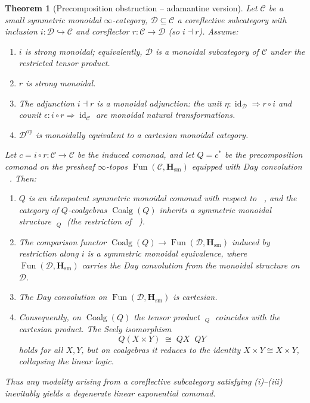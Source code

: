 \documentclass[12pt,a4paper]{article}
\theoremstyle{plain}
\newtheorem{theorem}{Theorem}[section]
\theoremstyle{definition}
\DeclareMathOperator{\Coalg}{Coalg}
\DeclareMathOperator{\id}{id}
\DeclareMathOperator{\Fun}{Fun}
\DeclareMathOperator{\Day}{\otimes_{\mathrm{Day}}}
\begin{document}
\begin{theorem}[Precomposition obstruction -- adamantine version]\label{thm:obstruction}
Let $\mathcal{C}$ be a small symmetric monoidal $\infty$-category,
$\mathcal{D}\subseteq\mathcal{C}$ a coreflective subcategory with inclusion
$i:\mathcal{D}\hookrightarrow\mathcal{C}$ and coreflector $r:\mathcal{C}\to\mathcal{D}$
(so $i\dashv r$).  Assume:
\begin{enumerate}[nosep,label=(\roman*)]
\item $i$ is strong monoidal; equivalently, $\mathcal{D}$ is a monoidal subcategory of $\mathcal{C}$ under the restricted tensor product.
\item $r$ is strong monoidal.
\item The adjunction $i \dashv r$ is a monoidal adjunction: the unit $\eta : \id_{\mathcal{D}} \Rightarrow r \circ i$ and counit $\epsilon : i \circ r \Rightarrow \id_{\mathcal{C}}$ are monoidal natural transformations.
\item $\mathcal{D}^{\mathrm{op}}$ is monoidally equivalent to a cartesian monoidal category.
\end{enumerate}
Let $c = i\circ r : \mathcal{C}\to\mathcal{C}$ be the induced comonad, and let
$Q = c^{*}$ be the precomposition comonad on the presheaf $\infty$-topos
$\Fun(\mathcal{C},\mathbf{H}_{\mathrm{sm}})$ equipped with Day convolution $\Day$.
Then:
\begin{enumerate}[nosep,label=(\arabic*)]
\item $Q$ is an idempotent symmetric monoidal comonad with respect to $\Day$, and the category of $Q$-coalgebras $\Coalg(Q)$ inherits a symmetric monoidal structure $\Day_Q$ (the restriction of $\Day$).
\item The comparison functor $\Coalg(Q)\to\Fun(\mathcal{D},\mathbf{H}_{\mathrm{sm}})$ induced by restriction along $i$ is a symmetric monoidal equivalence, where $\Fun(\mathcal{D},\mathbf{H}_{\mathrm{sm}})$ carries the Day convolution from the monoidal structure on $\mathcal{D}$.
\item The Day convolution on $\Fun(\mathcal{D},\mathbf{H}_{\mathrm{sm}})$ is cartesian.
\item Consequently, on $\Coalg(Q)$ the tensor product $\Day_Q$ coincides with the cartesian product.  The Seely isomorphism
\[
Q(X\times Y)\;\cong\; QX \Day QY
\]
holds for all $X,Y$, but on coalgebras it reduces to the identity $X\times Y\cong X\times Y$, collapsing the linear logic.
\end{enumerate}
Thus any modality arising from a coreflective subcategory satisfying (i)--(iii) inevitably yields a degenerate linear exponential comonad.
\end{theorem}
\end{document}
